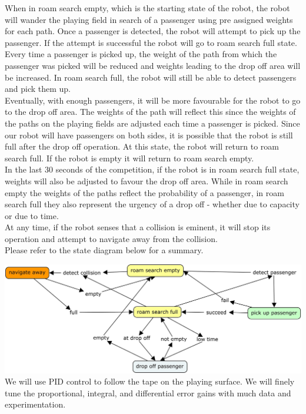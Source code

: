 \documentclass[12pt]{article}
\begin{document}
When in roam search empty, which is the starting state of the robot, the robot
will wander the playing field in search of a passenger using pre assigned
weights for each path.  Once a passenger is detected, the robot will attempt to
pick up the passenger.  If the attempt is successful the robot will go to roam
search full state.\\

Every time a passenger is picked up, the weight of the path from which the
passenger was picked will be reduced and weights leading to the drop off area
will be increased.  In roam search full, the robot will still be able to detect
passengers and pick them up.\\

Eventually, with enough passengers, it will be more favourable for the robot to
go to the drop off area.  The weights of the path will reflect this since the
weights of the paths on the playing fields are adjusted each time a passenger is
picked.  Since our robot will have passengers on both sides, it is possible that
the robot is still full after the drop off operation.  At this state, the robot
will return to roam search full.  If the robot is empty it will return to roam
search empty.\\

In the last 30 seconds of the competition, if the robot is in roam search full
state, weights will also be adjusted to favour the drop off area.  While in roam
search empty the weights of the paths reflect the probability of a passenger, in
roam search full they also represent the urgency of a drop off - whether due to
capacity or due to time.\\

At any time, if the robot senses that a collision is eminent, it will stop its
operation and attempt to navigate away from the collision.\\

Please refer to the state diagram below for a summary.

\includegraphics[scale=0.2]{robot-state-diagram}
We will use PID control to follow the tape on the playing surface.  We will
finely tune the proportional, integral, and differential error gains with much
data and experimentation.
\end{document}
